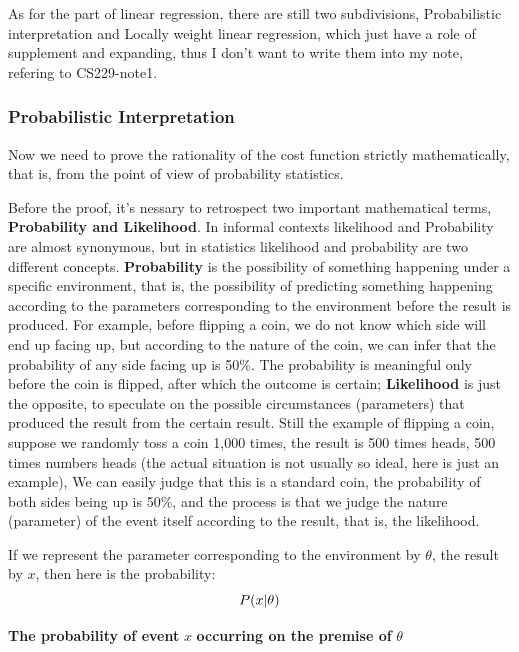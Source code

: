 \documentclass[fontset=windows,pass]{article}
\numberwithin{equation}{subsection} %
\begin{document}
As for the part of linear regression, there are still two subdivisions, Probabilistic interpretation
and Locally weight linear regression, which just have a role of supplement and expanding, thus I don't
want to write them into my note, refering to CS229-note1.

\subsubsection{Probabilistic Interpretation}
Now we need to prove the rationality of the cost function strictly mathematically, that is, 
from the point of view of probability statistics.

Before the proof, it's nessary to retrospect two important mathematical terms, \textbf{Probability and Likelihood}.
In informal contexts likelihood and Probability are almost synonymous, but in statistics likelihood and probability are two different concepts.
\textbf{Probability} is the possibility of something happening under a specific environment, that is, the possibility of predicting something happening according to 
the parameters corresponding to the environment before the result is produced. For example, before flipping a coin, we do not know which side will end up facing up, 
but according to the nature of the coin, we can infer that the probability of any side facing up is 50\%. The probability is meaningful only before the coin is flipped, 
after which the outcome is certain; \textbf{Likelihood} is just the opposite, to speculate on the possible circumstances (parameters) that produced the result from the 
certain result. Still the example of flipping a coin, suppose we randomly toss a coin 1,000 times, the result is 500 times heads, 500 times numbers heads (the actual situation is 
not usually so ideal, here is just an example), We can easily judge that this is a standard coin, the probability of both sides being up is 50\%, and the process is that we judge the 
nature (parameter) of the event itself according to the result, that is, the likelihood.

If we represent the parameter corresponding to the environment by $\theta$, the result by $x$, then here is the probability:
\begin{equation*}
	P(x \arrowvert \theta)
\end{equation*}

\begin{center}
	\textbf{The probability of event} $x$ \textbf{occurring on the premise of} $\theta$
\end{center}
\end{document}
